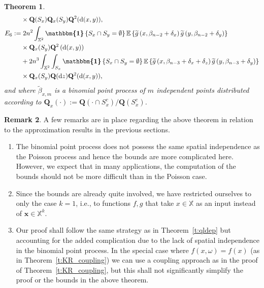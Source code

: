 \documentclass[10pt]{amsart}
\newtheorem{theo}{Theorem}[section]
\theoremstyle{definition}\newtheorem{defi}[theo]{Definition}\newtheorem{rema}[theo]{Remark}\newtheorem{exam}[theo]{Example}\newtheorem{exem}[theo]{Example}\newtheorem{nota}[theo]{Notation}
\newcommand{\bx}{\mathbf{x}}
\newcommand{\bQ}{\mathbf{Q}}
\newcommand*\X{\mathbb{X}}
\newcommand{\E}{\mathbb{E}}
\newcommand*\md{\mathrm{d}}
\newcommand{\mean}[1] {\E\left\{{#1}\right\}}
\newcommand{\ind}{\boldsymbol{\mathbbm{1}}}
\newcommand{\tg}{\tilde{g}}
\let\oldtilde\tilde
\renewcommand*{\tilde}[1]{\mathchoice{\widetilde{#1}}{\widetilde{#1}}{\oldtilde{#1}}{\oldtilde{#1}}}
\begin{document}
\begin{theo}
\begin{align*}
&\times \bQ(S_x) \bQ_x(S_y) \bQ^2(\md(x,y)), \allowdisplaybreaks \\
E_6 :=&\; 2n^2 \int_{\X^2} \ind\left\{S_x\cap S_y=\emptyset\right\} \mean{ \tg\left(x,\beta_{n-2}+\delta_x\right) \tg\left(y,\beta_{n-2}+\delta_y\right) }\\
& \times\bQ_x(S_y) \bQ^2\left(\md(x,y)\right) \\
& + 2n^3 \int_{\X^2} \int_{S_x} \ind\left\{S_x\cap S_y=\emptyset\right\} \mean{ \tg\left(x,\beta_{n-3}+\delta_x+\delta_z\right) \tg\left(y,\beta_{n-3}+\delta_y\right) } \\
& \times\bQ_x(S_y) \bQ(\md z) \bQ^2(\md(x,y)), 
\end{align*}
and where $\widetilde{\beta}_{x,m}$ is a binomial point process of $m$ independent points distributed according to $\bQ_x(\cdot):=\bQ(\cdot\cap S_x^c)/\bQ(S_x^c)$.
\end{theo}


\begin{rema}\label{r:krbin}
A few remarks are in place regarding the above theorem in relation to the approximation results in the previous sections.
\begin{enumerate}
\item The binomial point process does not possess the same spatial independence as the Poisson process and hence the bounds are more complicated here. However, we expect that in many applications, the computation of the bounds should not be more difficult than in the Poisson case.

\item Since the bounds are already quite involved, we have restricted ourselves to only the case $k=1$, i.e., to functions $f,g$ that take $x \in \X$ as an input instead of $\bx \in \X^k$.

\item Our proof shall follow the same strategy as in Theorem~\ref{t:qldep} but accounting for the added complication due to the lack of spatial independence in the binomial point process. In the special case where $f(x,\omega) = f(x)$ (as in Theorem~\ref{t:KR_coupling}) we can use a coupling approach as in the proof of Theorem~\ref{t:KR_coupling}, but this shall not significantly simplify the proof or the bounds in the above theorem.
\end{enumerate}
\end{rema}
\end{document}
